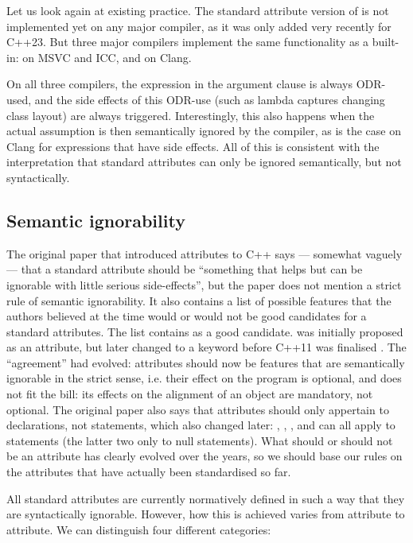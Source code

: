 Let us look again at existing practice. The standard attribute version of  is not implemented yet on any major compiler, as it was only added very recently for C++23. But three major compilers implement the same functionality as a built-in:  on MSVC and ICC, and \mbox{} on Clang.

On all three compilers, the expression in the argument clause is always ODR-used, and the side effects of this ODR-use (such as lambda captures changing class layout) are always triggered. Interestingly, this also happens when the actual assumption is then semantically ignored by the compiler, as is the case on Clang for expressions that have side effects. All of this is consistent with the interpretation that standard attributes can only be ignored semantically, but not syntactically.

\subsection{Semantic ignorability}
\label{subsec:semantic}

The original paper that introduced attributes to C++ \cite{N2761} says --- somewhat vaguely --- that a standard attribute should be  ``something that helps but can be ignorable with little serious side-effects'', but the paper does not mention a strict rule of semantic ignorability. It also contains a list of possible features that the authors believed at the time would or would not be good candidates for a standard attributes. The list contains  as a good candidate.  was initially proposed as an attribute, but later changed to a keyword before C++11 was finalised \cite{N3190}. The ``agreement'' had evolved: attributes should now be features that are semantically ignorable in the strict sense, i.e. their effect on the program is optional, and  does not fit the bill: its effects on the alignment of an object are mandatory, not optional. The original paper also says that attributes should only appertain to declarations, not statements, which also changed later: , , , and  can all apply to statements (the latter two only to null statements). What should or should not be an attribute has clearly evolved over the years, so we should base our rules on the attributes that have actually been standardised so far.

All standard attributes are currently normatively defined in such a way that they are syntactically ignorable. However, how this is achieved varies from attribute to attribute. We can distinguish four different categories:

